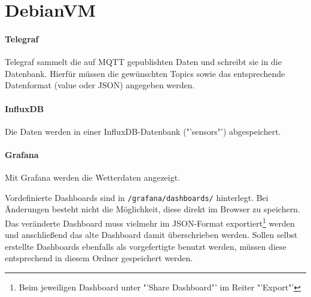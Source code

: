 \section{DebianVM}
\paragraph{Telegraf}
Telegraf sammelt die auf MQTT gepublishten Daten und schreibt sie in die Datenbank. Hierfür müssen die gewünschten Topics sowie das entsprechende Datenformat (value oder JSON) angegeben werden. 

\paragraph{InfluxDB}
Die Daten werden in einer InfluxDB-Datenbank ("'sensors"') abgespeichert.

\paragraph{Grafana}
Mit Grafana werden die Wetterdaten angezeigt. 

Vordefinierte Dashboards sind in \verb|/grafana/dashboards/| hinterlegt. Bei Änderungen besteht nicht die Möglichkeit, diese direkt im Browser zu speichern. Das veränderte Dashboard muss vielmehr im JSON-Format exportiert\footnote{Beim jeweiligen Dashboard unter "'Share Dashboard"' im Reiter "'Export"'} werden und anschließend das alte Dashboard damit überschrieben werden. 
Sollen selbst erstellte Dashboards ebenfalls als vorgefertigte benutzt werden, müssen diese entsprechend in diesem Ordner gespeichert werden.


